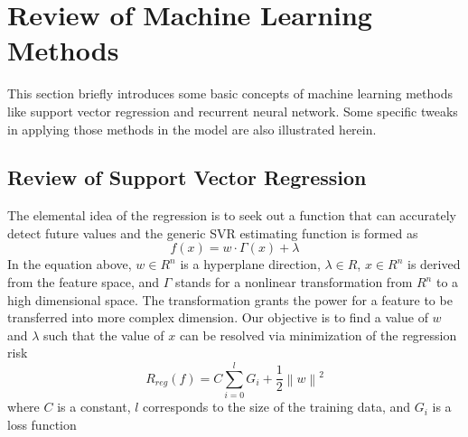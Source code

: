 \section{Review of Machine Learning Methods}
\label{sec:machine_learning_review}
This section briefly introduces some basic concepts of machine learning methods like support vector regression and recurrent neural network. Some specific tweaks in applying those methods in the model are also illustrated herein.

\subsection{Review of Support Vector Regression}
The elemental idea of the regression is to seek out a function that can accurately detect future values and the generic SVR estimating function is formed as
\begin{equation}
f\left( x \right) =  {w \cdot \Gamma \left( x \right)}  + \lambda
\label{eq:1}
\end{equation}
\textcolor{feb18rev}{In the equation above, $w \in {R^n}$ is a hyperplane direction, $\lambda \in {R}$, $x \in {R^n}$ is derived from the feature space, and $\Gamma$ stands for a nonlinear transformation from $R^n$ to a high dimensional space.} The transformation grants the power for a feature to be transferred into more complex dimension. Our objective is to find a value of $w$ and $\lambda$ such that the value of $x$ can be resolved via minimization of the regression risk
\begin{equation}
{R_{reg}}\left( f \right) = C\sum\limits_{i = 0}^l {{G _i} + \frac{1}{2}{{\left\| w \right\|}^2}}
\label{eq:2}
\end{equation}
\textcolor{feb18rev}{where $C$ is a constant, $l$ corresponds to the size of the training data, and ${G _i}$ is a loss function}
